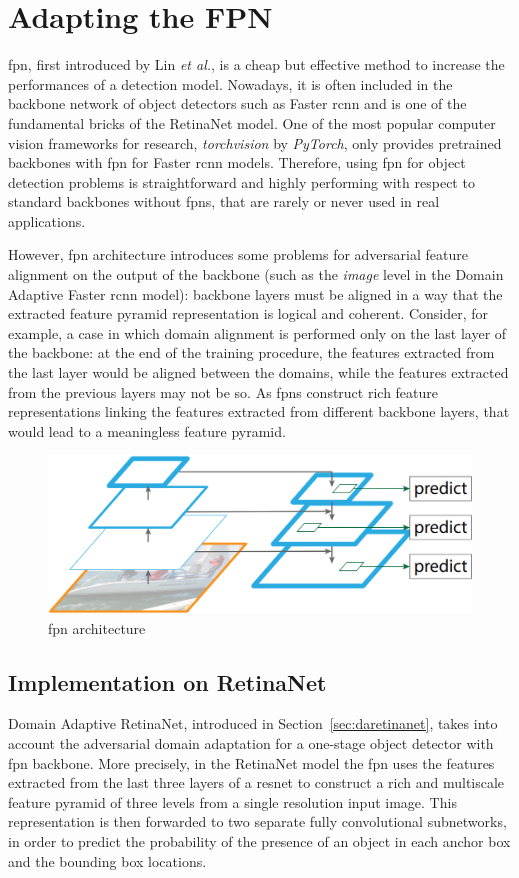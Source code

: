 \documentclass[%
    corpo=12pt,
    twoside,
    stile=classica,   
    tipotesi=magistrale,
    evenboxes,
    english,
	numerazioneromana,
]{toptesi}
\begin{document}
\section{Adapting the FPN}
\acrfull{fpn}, first introduced by Lin \textit{et al.}\cite{lin2017feature}, is a cheap but effective method to increase the performances of a detection model. Nowadays, it is often included in the backbone network of object detectors such as Faster \gls{rcnn} and is one of the fundamental bricks of the RetinaNet model. One of the most popular computer vision frameworks for research, \textit{torchvision} by \textit{PyTorch}\cite{paszke2019pytorch}, only provides pretrained backbones with \gls{fpn} for Faster \gls{rcnn} models. Therefore, using \gls{fpn} for object detection problems is straightforward and highly performing with respect to standard backbones without \glspl{fpn}, that are rarely or never used in real applications.

However, \gls{fpn} architecture introduces some problems for adversarial feature alignment on the output of the backbone (such as the \textit{image} level in the Domain Adaptive Faster \gls{rcnn} model): backbone layers must be aligned in a way that the extracted feature pyramid representation is logical and coherent. Consider, for example, a case in which domain alignment is performed only on the last layer of the backbone: at the end of the training procedure, the features extracted from the last layer would be aligned between the domains, while the features extracted from the previous layers may not be so. As \glspl{fpn} construct rich feature representations linking the features extracted from different backbone layers, that would lead to a meaningless feature pyramid.

\begin{figure}[ht]
	\centering
	\includegraphics[width=.6\linewidth]{imgs/fpn.png}
	\caption{\Gls{fpn} architecture\cite{chen2018domain}}
	\label{fig:fpn}
\end{figure}

\subsection{Implementation on RetinaNet}
Domain Adaptive RetinaNet, introduced in Section~\ref{sec:daretinanet}, takes into account the adversarial domain adaptation for a one-stage object detector with \gls{fpn} backbone. More precisely, in the RetinaNet model the \gls{fpn} uses the features extracted from the last three layers of a \gls{resnet} to construct a rich and multiscale feature pyramid of three levels from a single resolution input image. This representation is then forwarded to two separate fully convolutional subnetworks, in order to predict the probability of the presence of an object in each anchor box and the bounding box locations.
\end{document}
